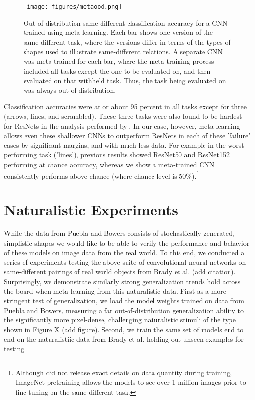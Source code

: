 \documentclass[10pt,letterpaper]{article}
\begin{document}
\begin{figure}[htb!]
    \centering
    \texttt{[image: figures/metaood.png]}
    \caption{Out-of-distribution same-different classification accuracy for a CNN trained using meta-learning. Each bar shows one version of the same-different task, where the versions differ in terms of the types of shapes used to illustrate same-different relations. A separate CNN was meta-trained for each bar, where the meta-training process included all tasks except the one to be evaluated on, and then evaluated on that withheld task. Thus, the task being evaluated on was always out-of-distribution.}
    \label{fig:fig5}
\end{figure}

Classification accuracies were at or about 95 percent in all tasks except for three (arrows, lines, and scrambled). These three tasks were also found to be hardest for ResNets in the analysis performed by . In our case, however, meta-learning allows even these shallower CNNs to outperform ResNets in each of these 'failure' cases by significant margins, and with much less data. For example in the worst performing task ('lines'), previous results showed ResNet50 and ResNet152 performing at chance accuracy, whereas we show a meta-trained CNN consistently performs above chance (where chance level is 50\%).\footnote{Although  did not release exact details on data quantity during training, ImageNet pretraining allows the models to see over 1 million images prior to fine-tuning on the same-different task.}

\section{Naturalistic Experiments}

While the data from Puebla and Bowers consists of   stochastically generated, simplistic shapes we would like to be able to verify the performance and behavior of these models on image data from the real world. To this end, we conducted a series of experiments testing the above suite of convolutional neural networks on same-different pairings of real world objects from Brady et al. (add citation). Surprisingly, we demonstrate similarly strong generalization trends hold across the board when meta-learning from this naturalistic data. First as a more stringent test of generalization, we load the model weights trained on data from Puebla and Bowers, measuring a far out-of-distribution generalization ability to the significantly more pixel-dense, challenging naturalistic stimuli of the type shown in Figure X (add figure). Second, we train the same set of models end to end on the naturalistiic data from Brady et al. holding out unseen examples for testing. 
\end{document}
